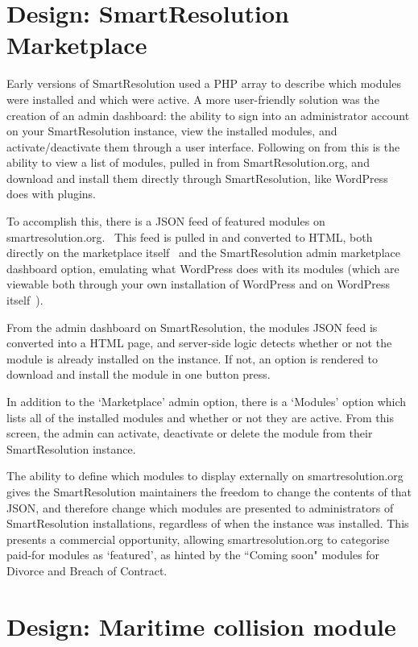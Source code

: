\section{Design: SmartResolution Marketplace}

Early versions of SmartResolution used a PHP array to describe which modules were installed and which were active. A more user-friendly solution was the creation of an admin dashboard: the ability to sign into an administrator account on your SmartResolution instance, view the installed modules, and activate/deactivate them through a user interface. Following on from this is the ability to view a list of modules, pulled in from SmartResolution.org, and download and install them directly through SmartResolution, like WordPress does with plugins.

To accomplish this, there is a JSON feed of featured modules on smartresolution.org.~\cite{smartresolution:marketplaceFeed} This feed is pulled in and converted to HTML, both directly on the marketplace itself~\cite{smartresolution:marketplace} and the SmartResolution admin marketplace dashboard option, emulating what WordPress does with its modules (which are viewable both through your own installation of WordPress and on WordPress itself~\cite{wordpress:pluginDirectory}).

From the admin dashboard on SmartResolution, the modules JSON feed is converted into a HTML page, and server-side logic detects whether or not the module is already installed on the instance. If not, an option is rendered to download and install the module in one button press.

In addition to the `Marketplace' admin option, there is a `Modules' option which lists all of the installed modules and whether or not they are active. From this screen, the admin can activate, deactivate or delete the module from their SmartResolution instance.

The ability to define which modules to display externally on smartresolution.org gives the SmartResolution maintainers the freedom to change the contents of that JSON, and therefore change which modules are presented to administrators of SmartResolution installations, regardless of when the instance was installed. This presents a commercial opportunity, allowing smartresolution.org to categorise paid-for modules as `featured', as hinted by the ``Coming soon" modules for Divorce and Breach of Contract.

\section{Design: Maritime collision module}

